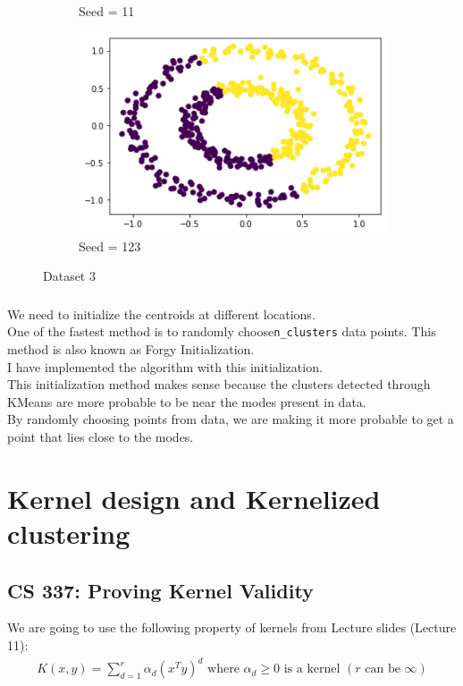 \documentclass[12pt, fleqn]{article}
\begin{document}
\begin{figure}[H]
\begin{subfigure}[H]{0.35\textwidth}
        \caption[]{Seed = 11}
    \end{subfigure}
    \begin{subfigure}[H]{0.35\textwidth}
        \centering
        \includegraphics[width=\textwidth]{plots/D3/123.png}
        \caption[]{Seed = 123}
    \end{subfigure}
    \caption[]{Dataset 3}
\end{figure}

\subsubsection{}
We need to initialize the centroids at different locations. \\
One of the fastest method is to randomly choose\verb!n_clusters! data points. This method is also known as Forgy Initialization. \\
I have implemented the algorithm with this initialization. \\
This initialization method makes sense because the clusters detected through KMeans are more probable to be near the modes present in data. \\
By randomly choosing points from data, we are making it more probable to get a point that lies close to the modes.


\newpage
\section{Kernel design and Kernelized clustering}
\subsection{CS 337: Proving Kernel Validity}
We are going to use the following property of kernels from Lecture slides (Lecture 11):
\begin{equation*}
    \begin{aligned}
        K(x,y) = \sum_{d=1}^r \alpha_d(x^T y)^d \text{ where } \alpha_d \ge 0 \text{ is a kernel } (r \text{ can be } \infty)
    \end{aligned}
\end{equation*}
\end{document}
